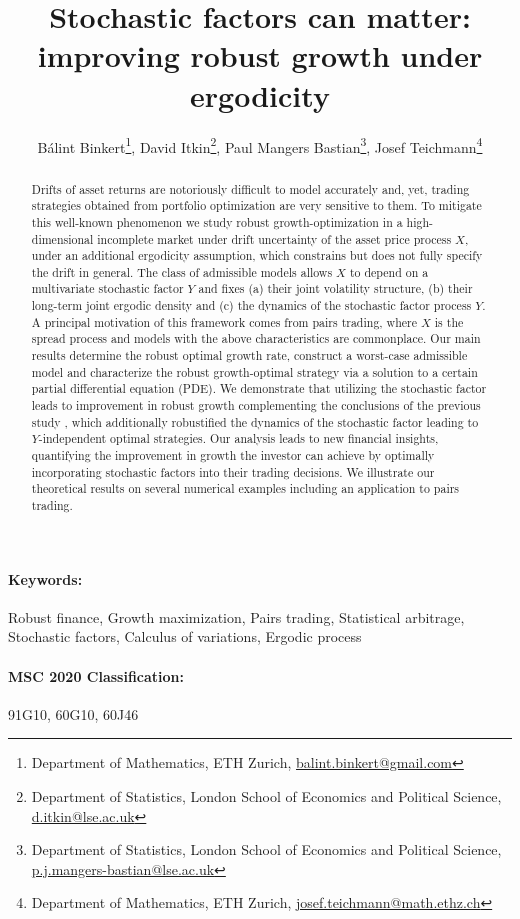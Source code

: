 \documentclass{article}
\title{Stochastic factors can matter: \\ improving robust growth under ergodicity}
\author{B\'alint Binkert\footnote{Department of Mathematics, ETH Zurich, \href{mailto:balint.binkert@gmail.com}{balint.binkert@gmail.com}}, David Itkin\footnote{Department of Statistics, London School of Economics and Political Science, \href{mailto:d.itkin@lse.ac.uk}{d.itkin@lse.ac.uk}}, Paul Mangers Bastian\footnote{Department of Statistics, London School of Economics and Political Science, \href{mailto:P.J.Mangers-Bastian@lse.ac.uk}{p.j.mangers-bastian@lse.ac.uk}}, Josef Teichmann\footnote{Department of Mathematics, ETH Zurich, \href{mailto:josef.teichmann@math.ethz.ch}{josef.teichmann@math.ethz.ch}}}
\theoremstyle{plain}
\theoremstyle{definition}
\numberwithin{lem}{section}
\begin{document}
\maketitle

\begin{abstract}
    Drifts of asset returns are notoriously difficult to model accurately and, yet, trading strategies obtained from portfolio optimization are very sensitive to them. To mitigate this well-known phenomenon we study robust growth-optimization in a high-dimensional incomplete market under drift uncertainty of the asset price process $X$, under an additional ergodicity assumption, which constrains but does not fully specify the drift in general. The class of admissible models allows $X$ to depend on a multivariate stochastic factor $Y$ and fixes (a) their joint volatility structure, (b) their long-term joint ergodic density and (c) the dynamics of the stochastic factor process $Y$. A principal motivation of this framework comes from pairs trading, where $X$ is the spread process and models with the above characteristics are commonplace. Our main results determine the robust optimal growth rate, construct a worst-case admissible model and characterize the robust growth-optimal strategy via a solution to a certain partial differential equation (PDE). We demonstrate that utilizing the stochastic factor leads to improvement in robust growth complementing the conclusions of the previous study \cite{itkin2025ergodic}, which additionally robustified the dynamics of the stochastic factor leading to $Y$-independent optimal strategies. Our analysis leads to new financial insights, quantifying the improvement in growth the investor can achieve by optimally incorporating stochastic factors into their trading decisions. We illustrate our theoretical results on several numerical examples including an application to pairs trading. 
\end{abstract}


\paragraph*{Keywords:} Robust finance, Growth maximization, Pairs trading, Statistical arbitrage, Stochastic factors, Calculus of variations, Ergodic process

\paragraph*{MSC 2020 Classification:} 91G10, 60G10, 60J46
\end{document}
